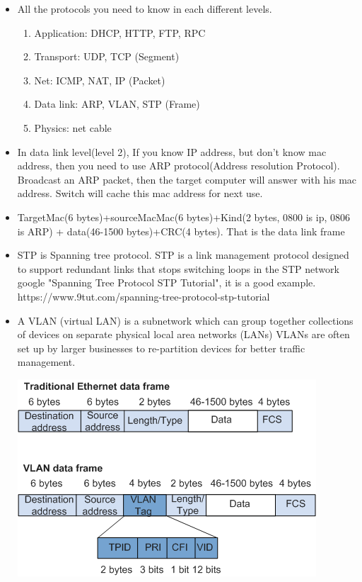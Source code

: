 \documentclass[a4paper,11pt,twoside]{book}
\begin{document}
\begin{itemize}
	\item All the protocols you need to know in each different levels.
	\begin{enumerate}
		\item Application: DHCP, HTTP, FTP, RPC
		\item Transport: UDP, TCP (Segment)
		\item Net: ICMP,  NAT, IP (Packet)
		\item Data link: ARP, VLAN, STP (Frame)
		\item Physics: net cable
	\end{enumerate}

	\item In data link level(level 2), If you know IP address, but don't know mac address, then you need to use ARP protocol(Address resolution Protocol). Broadcast an ARP packet, then the target computer will answer with his mac address. Switch will cache this mac address for next use.
	
	\item TargetMac(6 bytes)+sourceMacMac(6 bytes)+Kind(2 bytes, 0800 is ip, 0806 is ARP) + data(46-1500 bytes)+CRC(4 bytes). That is the data link frame 
	
	\item STP is Spanning tree protocol. STP is a link management protocol designed to support redundant links that stops switching loops in the STP network google "Spanning Tree Protocol STP Tutorial", it is a good example.
	https://www.9tut.com/spanning-tree-protocol-stp-tutorial
	
	\item A VLAN (virtual LAN) is a subnetwork which can group together collections of devices on separate physical local area networks (LANs) VLANs are often set up by larger businesses to re-partition devices for better traffic management.
	
	\begin{center}
	\includegraphics[width=0.65\linewidth]{pics/vlan.png}
	\end{center}
	

\end{itemize}
\end{document}
